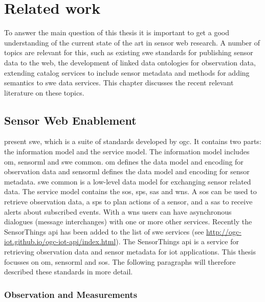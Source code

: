 

\chapter{Related work}
\label{chap:rw}
To answer the main question of this thesis it is important to get a good understanding of the current state of the art in sensor web research. A number of topics are relevant for this, such as existing \ac{swe} standards for publishing sensor data to the web, the development of linked data ontologies for observation data, extending catalog services to include sensor metadata and methods for adding semantics to \ac{swe} data services. This chapter discusses the recent relevant literature on these topics. 

\section{Sensor Web Enablement}

\cite{SW:OGC} present \acf{swe}, which is a suite of standards developed by \ac{ogc}. It contains two parts: the information model and the service model. The information model includes \ac{om}, \ac{sensorml} and \ac{swe} common. \ac{om} defines the data model and encoding for observation data  and \ac{sensorml} defines the data model and encoding for sensor metadata. \ac{swe} common is a low-level data model for exchanging sensor related data. The service model contains the \ac{sos}, \ac{sps}, \ac{sas} and \ac{wns}. A \ac{sos} can be used to retrieve observation data, a \ac{sps} to plan actions of a sensor, and a \ac{sas} to receive alerts about subscribed events. With a \ac{wns} users can have asynchronous dialogues (message interchanges) with one or more other services. Recently the SensorThings \ac{api} has been added to the list of \ac{swe} services (see \url{http://ogc-iot.github.io/ogc-iot-api/index.html}). The SensorThings \ac{api} is a service for retrieving observation data and sensor metadata for \ac{iot} applications. This thesis focusses on \ac{om}, \ac{sensorml} and \ac{sos}. The following paragraphs will therefore described these standards in more detail.

\subsection{Observation and Measurements}

